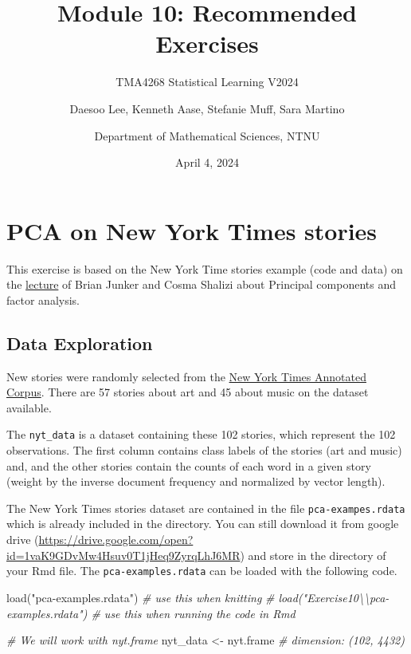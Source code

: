 \documentclass[
]{article}
\title{Module 10: Recommended Exercises}
\subtitle{TMA4268 Statistical Learning V2024}
\author{Daesoo Lee, Kenneth Aase, Stefanie Muff, Sara
Martino \and Department of Mathematical Sciences, NTNU}
\date{April 4, 2024}
\newenvironment{Shaded}{\begin{snugshade}}{\end{snugshade}}
\newcommand{\CommentTok}[1]{\textcolor[rgb]{0.56,0.35,0.01}{\textit{#1}}}
\newcommand{\FunctionTok}[1]{\textcolor[rgb]{0.00,0.00,0.00}{#1}}
\newcommand{\NormalTok}[1]{#1}
\newcommand{\OtherTok}[1]{\textcolor[rgb]{0.56,0.35,0.01}{#1}}
\newcommand{\StringTok}[1]{\textcolor[rgb]{0.31,0.60,0.02}{#1}}
\begin{document}
\maketitle

\hypertarget{pca-on-new-york-times-stories}{%
\section{PCA on New York Times
stories}\label{pca-on-new-york-times-stories}}

This exercise is based on the New York Time stories example (code and
data) on the \href{http://www.stat.cmu.edu/~cshalizi/490/10/}{lecture}
of Brian Junker and Cosma Shalizi about Principal components and factor
analysis.

\hypertarget{data-exploration}{%
\subsection{Data Exploration}\label{data-exploration}}

New stories were randomly selected from the
\href{https://catalog.ldc.upenn.edu/LDC2008T19}{New York Times Annotated
Corpus}. There are 57 stories about art and 45 about music on the
dataset available.

The \texttt{nyt\_data} is a dataset containing these 102 stories, which
represent the 102 observations. The first column contains class labels
of the stories (art and music) and, and the other stories contain the
counts of each word in a given story (weight by the inverse document
frequency and normalized by vector length).

The New York Times stories dataset are contained in the file
\texttt{pca-exampes.rdata} which is already included in the directory.
You can still download it from google drive
(\url{https://drive.google.com/open?id=1vaK9GDvMw4Hsuv0T1jHeq9ZyrqLhJ6MR})
and store in the directory of your Rmd file. The
\texttt{pca-examples.rdata} can be loaded with the following code.

\begin{Shaded}
\begin{Highlighting}[]
\FunctionTok{load}\NormalTok{(}\StringTok{"pca{-}examples.rdata"}\NormalTok{)  }\CommentTok{\# use this when knitting}
\CommentTok{\# load("Exercise10\textbackslash{}\textbackslash{}pca{-}examples.rdata")  \# use this when running the code in Rmd}

\CommentTok{\# We will work with nyt.frame}
\NormalTok{nyt\_data }\OtherTok{\textless{}{-}}\NormalTok{ nyt.frame  }\CommentTok{\# dimension: (102, 4432)}
\end{Highlighting}
\end{Shaded}
\end{document}
